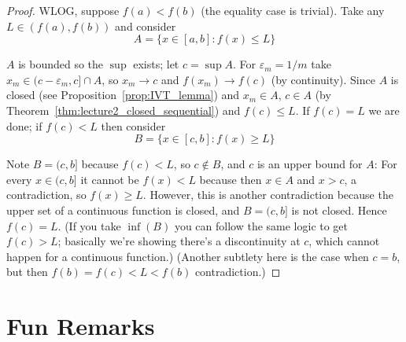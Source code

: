 \documentclass{article}
\theoremstyle{definition}
\begin{document}
\begin{proof}
  WLOG, suppose $f(a) < f(b)$ (the equality case is trivial). Take any $L \in (f(a), f(b))$ and consider
  \[
    A = \{x \in [a, b]: f(x) \le L\}
  \]

  $A$ is bounded so the $\sup$ exists; let $c = \sup A$. For $\varepsilon_m = 1/m$ take $x_m \in (c - \varepsilon_m, c] \cap A$, so $x_m \to c$ and $f(x_m) \to f(c)$ (by continuity). Since $A$ is closed (see Proposition~\ref{prop:IVT_lemma}) and $x_m \in A$, $c \in A$ (by Theorem~\ref{thm:lecture2_closed_sequential}) and $f(c) \le L$. If $f(c) = L$ we are done; if $f(c) < L$ then consider
  \[
    B = \{x \in [c, b]: f(x) \ge L\}
  \]

  Note $B = (c, b]$ because $f(c) < L$, so $c \notin B$, and $c$ is an upper bound for $A$: For every $x \in (c, b]$ it cannot be $f(x) < L$ because then $x \in A$ and $x > c$, a contradiction, so $f(x) \ge L$. However, this is another contradiction because the upper set of a continuous function is closed, and $B = (c, b]$ is not closed. Hence $f(c) = L$. (If you take $\inf(B)$ you can follow the same logic to get $f(c) > L$; basically we're showing there's a discontinuity at $c$, which cannot happen for a continuous function.) (Another subtlety here is the case when $c = b$, but then $f(b) = f(c) < L < f(b)$ contradiction.)
\end{proof}

\section{Fun Remarks}
\label{sub:fun_remarks}
\end{document}
